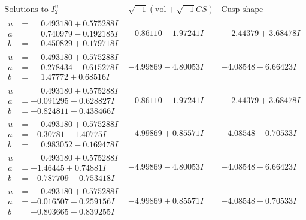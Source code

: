\documentclass[1p]{elsarticle_modified}
\theoremstyle{definition}
\newcommand{\I}{\sqrt{-1}}
\begin{document}
$$\begin{array}{c|c|c}  
\text{Solutions to }I^u_{2}& \I (\text{vol} + \sqrt{-1}CS) & \text{Cusp shape}\\
 \hline 
\begin{aligned}
u &= \phantom{-}0.493180 + 0.575288 I \\
a &= \phantom{-}0.740979 - 0.192185 I \\
b &= \phantom{-}0.450829 + 0.179718 I\end{aligned}
 & -0.86110 - 1.97241 I & \phantom{-}2.44379 + 3.68478 I \\ \hline\begin{aligned}
u &= \phantom{-}0.493180 + 0.575288 I \\
a &= \phantom{-}0.278434 - 0.615278 I \\
b &= \phantom{-}1.47772 + 0.68516 I\end{aligned}
 & -4.99869 - 4.80053 I & -4.08548 + 6.66423 I \\ \hline\begin{aligned}
u &= \phantom{-}0.493180 + 0.575288 I \\
a &= -0.091295 + 0.628827 I \\
b &= -0.824811 - 0.438466 I\end{aligned}
 & -0.86110 - 1.97241 I & \phantom{-}2.44379 + 3.68478 I \\ \hline\begin{aligned}
u &= \phantom{-}0.493180 + 0.575288 I \\
a &= -0.30781 - 1.40775 I \\
b &= \phantom{-}0.983052 - 0.169478 I\end{aligned}
 & -4.99869 + 0.85571 I & -4.08548 + 0.70533 I \\ \hline\begin{aligned}
u &= \phantom{-}0.493180 + 0.575288 I \\
a &= -1.46445 + 0.74881 I \\
b &= -0.787709 - 0.753418 I\end{aligned}
 & -4.99869 - 4.80053 I & -4.08548 + 6.66423 I \\ \hline\begin{aligned}
u &= \phantom{-}0.493180 + 0.575288 I \\
a &= -0.016507 + 0.259156 I \\
b &= -0.803665 + 0.839255 I\end{aligned}
 & -4.99869 + 0.85571 I & -4.08548 + 0.70533 I \\ \hline\begin{aligned}

\end{aligned}
\end{array}$$
\end{document}
